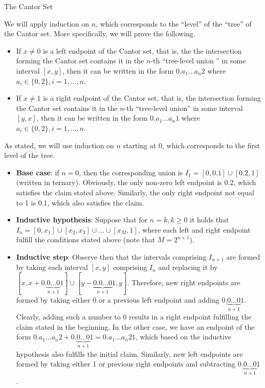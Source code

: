 \begin{section}{The Cantor Set}
\begin{solution}
    We will apply induction on $n$, which corresponds to the ``level'' of the ``tree'' of the Cantor set.
    More specifically, we will prove the following.
    \begin{itemize}
        \item If $x \neq 0$ is a left endpoint of the Cantor set, that is, the the intersection forming the Cantor set contains it in the $n$-th ``tree-level union '' in some interval $[x, y]$, then it can be written in the form $0.a_1 \ldots a_n 2$ where $a_i \in \{0, 2\}, i =1, \ldots, n$.
        \item If $x \neq 1$ is a right endpoint of the Cantor set, that is, the intersection forming the Cantor set contains it in the $n$-th ``tree-level union'' in some interval $[y, x]$, then it can be written in the form $0.a_1 \ldots a_n 1$ where $a_i \in \{0, 2\}, i =1, \ldots, n$.
    \end{itemize}
    As stated, we will use induction on $n$ starting at 0, which corresponds to the first level of the tree.
    \begin{itemize}
        \item \textbf{Base case}: if $n = 0$, then the corresponding union is $I_1 = [0, 0.1] \cup [0.2, 1]$ (written in ternary).
        Obviously, the only non-zero left endpoint is 0.2, which satisfies the claim stated above.
        Similarly, the only right endpoint not equal to 1 is 0.1, which also satisfies the claim.
        \item \textbf{Inductive hypothesis}: Suppose that for $n = k, k \geq 0$ it holds that $I_n = [0, x_1] \cup [x_2, x_3] \cup \ldots \cup [x_M, 1]$, where each left and right endpoint fulfill the conditions stated above (note that $M = 2^{n + 1}$).
        \item \textbf{Inductive step}: Observe then that the intervals comprising $I_{n+1}$ are formed by taking each interval $[x, y]$ comprising $I_n$ and replacing it by $[x, x + 0.\underbrace{0 \ldots 0}_{n + 1} 1] \cup [y - \underbrace{0.0\ldots 0}_{n + 1} 1, y]$.
        Therefore, new right endpoints are formed by taking either 0 or a previous left endpoint and adding $0.\underbrace{0 \ldots 0}_{n + 1} 1$.
        Clearly, adding such a number to 0 results in a right endpoint fulfilling the claim stated in the beginning.
        In the other case, we have an endpoint of the form $0.a_1 \ldots a_n 2 + 0.\underbrace{0 \ldots 0}_{n + 1} 1 = 0.a_1 \ldots a_n 2 1$, which based on the inductive hypothesis also fulfills the initial claim.
        Similarly, new left endpoints are formed by taking either 1 or previous right endpoints and subtracting $0.\underbrace{0 \ldots 0}_{n + 1} 1$.

\end{itemize}
\end{solution}
\end{section}
